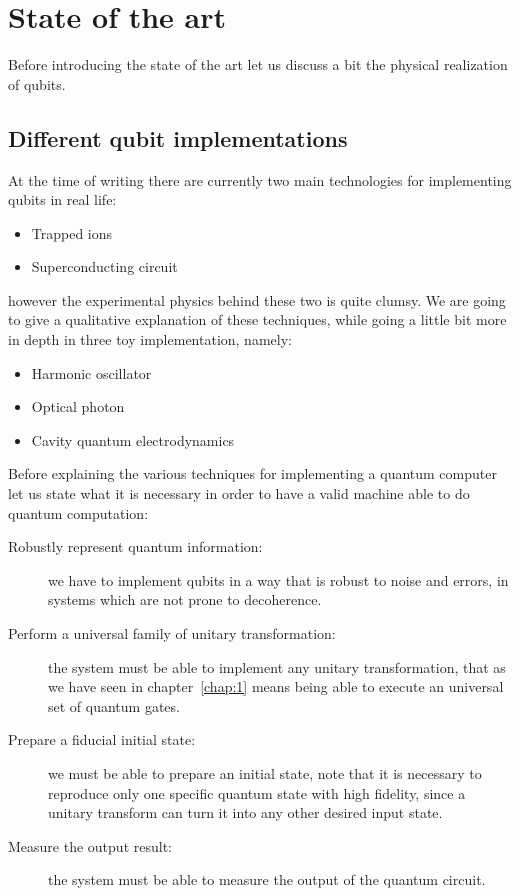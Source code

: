 \section{State of the art}

Before introducing the state of the art let us discuss a bit the physical realization of qubits.
\subsection{Different qubit implementations}

At the time of writing there are currently two main technologies for implementing qubits in real life:
\begin{itemize}
    \item Trapped ions
    \item Superconducting circuit
    \end{itemize}
however the experimental physics behind these two is quite clumsy. We are going to give a qualitative explanation of these techniques, while going a little bit more in depth in three toy implementation, namely:
\begin{itemize}
\item Harmonic oscillator
\item Optical photon
\item Cavity quantum electrodynamics
\end{itemize}

Before explaining the various techniques for implementing a quantum computer let us state what it is necessary in order to have a valid machine able to do quantum computation:
\begin{description}
    \item[Robustly represent quantum information:] we have to implement qubits in a way that is robust to noise and errors, in systems which are not prone to decoherence.
    \item[Perform a universal family of unitary transformation:] the system must be able to implement any unitary transformation, that as we have seen in chapter~\ref{chap:1} means being able to execute an universal set of quantum gates.
    \item[Prepare a fiducial initial state:] we must be able to prepare an initial state, note that it is necessary to reproduce only one specific quantum state with high fidelity, since a unitary transform can turn it into any other desired input state.
    \item[Measure the output result:] the system must be able to measure the output of the quantum circuit.
\end{description}

